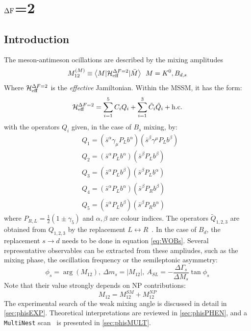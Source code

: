 \chapter{$\Delta \rm F$=2}
\label{sec:DF2}

\section{Introduction} %
The meson-antimeson ocillations are described by the mixing amplitudes~\cite{Altmannshofer:2009ne}
\begin{equation}
M_{12}^{(M)} \equiv \left \langle M | \mathcal{H}_{\rm eff}^{\Delta F = 2} | \bar{M} \right \rangle \ \, M = K^0, B_{d,s}
\end{equation}
Where $\mathcal{H}_{\rm eff}^{\Delta F = 2}$ is the \textit{effective} Jamiltonian. Within the MSSM, it has the form:
\begin{equation}
\mathcal{H}_{\rm eff}^{\Delta F = 2}  = \sum_{i=1}^{5}C_i Q_i + \sum_{i=1}^{3}\tilde{C}_i\tilde{Q}_i + \rm h.c.
\end{equation}
with the operators $Q_i$ given, in the case of $B_s$ mixing, by:
\begin{equation}
\begin{split}
& Q_1 = (\bar{s}^{\alpha}\gamma_{\mu}P_Lb^{\alpha})(\bar{s}^{\beta}\gamma^{\mu}P_Lb^{\beta}) \\
& Q_2 = (\bar{s}^{\alpha}P_Lb^{\alpha})(\bar{s}^{\beta}P_Lb^{\beta}) \\
& Q_3 = (\bar{s}^{\alpha}P_Lb^{\beta})(\bar{s}^{\beta}P_Lb^{\alpha}) \\
& Q_4 = (\bar{s}^{\alpha}P_Lb^{\alpha})(\bar{s}^{\beta}P_Rb^{\beta}) \\
& Q_5 = (\bar{s}^{\alpha}P_Lb^{\beta})(\bar{s}^{\beta}P_Rb^{\alpha})
\end{split}
\label{eq:WOBs}
\end{equation}
where $P_{R,L} = \frac{1}{2}(1 \pm \gamma_5)$ and $\alpha,\beta$ are colour indices. The operators $\tilde{Q}_{1,2,3}$ are obtained from $Q_{1,2,3}$ by the replacement $L \leftrightarrow R$~\cite{Altmannshofer:2009ne}. In the case of $B_d$, the replacement $s \rightarrow d$ needs to be done in equation \ref{eq:WOBs}. 
Several representative observables can be extracted from these ampliudes, such as the mixing phase, the oscillation frequency or the semileptonic asymmetry:
\begin{equation}
\phi_s = \arg{(M_{12})}, \ \Delta m_s = |M_{12}|, \ A_{SL} = -\frac{\Delta\Gamma_s}{\Delta M_s} \tan{\phi_s}
\end{equation}
Note that their value strongly depends on NP contributions:
\begin{equation}
M_{12} = M_{12}^{SM} + M_{12}^{NP} 
\end{equation}
The experimental search of the weak mixing angle is discussed in detail in \ref{sec:phisEXP}. Theoretical interpretations  are reviewed in \ref{sec:phisPHEN}, and a \texttt{MultiNest} scan~\cite{Feroz:2008xx} is presented in \ref{sec:phisMULT}. 

